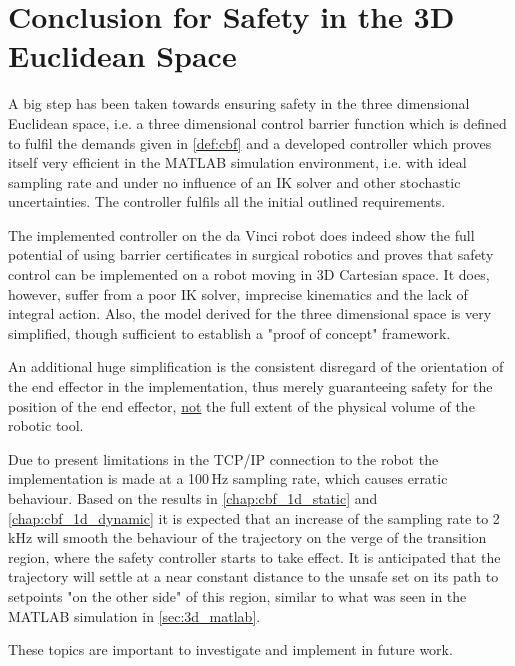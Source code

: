 \section{Conclusion for Safety in the 3D Euclidean Space}
\vspace{-3mm}	
A big step has been taken towards ensuring safety in the three dimensional Euclidean space, i.e. a three dimensional control barrier function which is defined to fulfil the demands given in \autoref{def:cbf} and a developed controller which proves itself very efficient in the MATLAB simulation environment, i.e. with ideal sampling rate and under no influence of an IK solver and other stochastic uncertainties. The controller fulfils all the initial outlined requirements.

The implemented controller on the da Vinci robot does indeed show the full potential of using barrier certificates in surgical robotics and proves that safety control can be implemented on a robot moving in 3D Cartesian space. It does, however, suffer from a poor IK solver, imprecise kinematics and the lack of integral action. Also, the model derived for the three dimensional space is very simplified, though sufficient to establish a "proof of concept" framework. 

An additional huge simplification is the consistent disregard of the orientation of the end effector in the implementation, thus merely guaranteeing safety for the position of the end effector, \underline{not} the full extent of the physical volume of the robotic tool. 

Due to present limitations in the TCP/IP connection to the robot the implementation is made at a 100\,Hz sampling rate, which causes erratic behaviour. Based on the results in \autoref{chap:cbf_1d_static} and \autoref{chap:cbf_1d_dynamic} it is expected that an increase of the sampling rate to  2\,kHz will smooth the behaviour of the trajectory on the verge of the transition region, where the safety controller starts to take effect. It is anticipated that the trajectory will settle at a near constant distance to the unsafe set on its path to setpoints "on the other side" of this region, similar to what was seen in the MATLAB simulation in \autoref{sec:3d_matlab}.

These topics are important to investigate and implement in future work.

